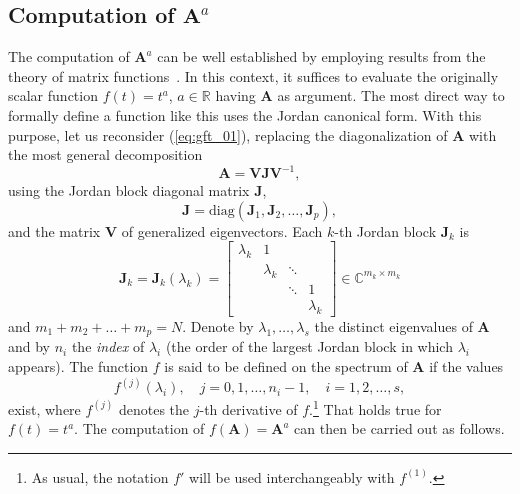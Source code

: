 \subsection{Computation of $\mathbf{A}^{{a}}$}\label{subsec:comp}
The computation of $\mathbf{A}^a$ can be well established by employing results from the theory of matrix functions~\cite{higham2008functions}. In this context, it suffices to evaluate the originally scalar function $f(t)=t^a$, $a\in\mathbb{R}$ having $\mathbf{A}$ as argument. The most direct way to formally define a function like this uses the Jordan canonical form. With this purpose, let us reconsider (\ref{eq:gft_01}), replacing the diagonalization of $\mathbf{A}$ with the most general decomposition
\begin{equation}
    \label{eq:Ajordan}
    \mathbf{A} = \mathbf{V} \mathbf{J} \mathbf{V}^{-1},
\end{equation}
using the Jordan block diagonal matrix $\mathbf{J}$,
\begin{equation}\label{eq:jcf}
    \mathbf{J}=\mathrm{diag}(\mathbf{J}_1,\mathbf{J}_2,\ldots,\mathbf{J}_p),
\end{equation}
and the matrix $\mathbf{V}$ of generalized eigenvectors. Each $k$-th Jordan block $\mathbf{J}_k$ is
\begin{equation}
    \mathbf{J}_k=\mathbf{J}_k(\lambda_k)=\left[\begin{array}{cccc}
            \lambda_k & 1         &        &           \\
                      & \lambda_k & \ddots &           \\
                      &           & \ddots & 1         \\
                      &           &        & \lambda_k
        \end{array}\right]\in\mathbb{C}^{m_k\times m_k}
\end{equation}
and $m_1+m_2+\ldots +m_p=N$. Denote by $\lambda_1,\ldots,\lambda_s$ the distinct eigenvalues of $\mathbf{A}$ and by $n_i$ the \emph{index} of $\lambda_i$ (the order of the largest Jordan block in which $\lambda_i$ appears). The function $f$ is said to be defined on the spectrum of $\mathbf{A}$ if the values
\begin{equation}\label{eq:defspec}
    f^{(j)}(\lambda_i),\quad j=0,1,\ldots,n_i-1,\quad i=1,2,\ldots,s,
\end{equation}
exist, where $f^{(j)}$ denotes the $j$-th derivative of $f$.\footnote{As usual, the notation $f'$ will be used interchangeably with $f^{(1)}$.} That holds true for $f(t)=t^a$. The computation of $f(\mathbf{A})=\mathbf{A}^a$ can then be carried out as follows.
